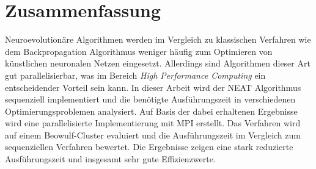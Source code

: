 \section*{Zusammenfassung}
Neuroevolutionäre Algorithmen werden im Vergleich zu klassischen Verfahren wie dem Backpropagation Algorithmus weniger häufig zum Optimieren von künstlichen neuronalen Netzen eingesetzt. Allerdings sind Algorithmen dieser Art gut parallelisierbar, was im Bereich \emph{High Performance Computing} ein entscheidender Vorteil sein kann. In dieser Arbeit wird der \acs*{NEAT} Algorithmus sequenziell implementiert und die benötigte Ausführungszeit in verschiedenen Optimierungsproblemen analysiert. Auf Basis der dabei erhaltenen Ergebnisse wird eine parallelisierte Implementierung mit \acs*{MPI} erstellt. Das Verfahren wird auf einem Beowulf-Cluster evaluiert und die Ausführungszeit im Vergleich zum sequenziellen Verfahren bewertet. Die Ergebnisse zeigen eine stark reduzierte Ausführungszeit und insgesamt sehr gute Effizienzwerte.

